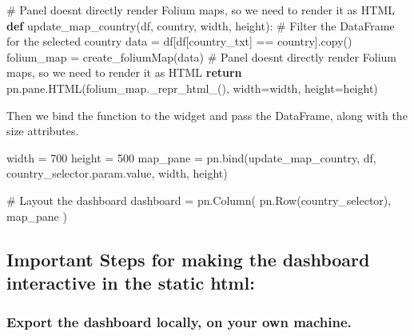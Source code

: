 \documentclass[
  letterpaper,
  DIV=11,
  numbers=noendperiod]{scrreprt}
\newenvironment{Shaded}{\begin{snugshade}}{\end{snugshade}}
\newcommand{\CommentTok}[1]{\textcolor[rgb]{0.37,0.37,0.37}{#1}}
\newcommand{\ControlFlowTok}[1]{\textcolor[rgb]{0.00,0.23,0.31}{\textbf{#1}}}
\newcommand{\DecValTok}[1]{\textcolor[rgb]{0.68,0.00,0.00}{#1}}
\newcommand{\KeywordTok}[1]{\textcolor[rgb]{0.00,0.23,0.31}{\textbf{#1}}}
\newcommand{\NormalTok}[1]{\textcolor[rgb]{0.00,0.23,0.31}{#1}}
\newcommand{\OperatorTok}[1]{\textcolor[rgb]{0.37,0.37,0.37}{#1}}
\newcommand{\StringTok}[1]{\textcolor[rgb]{0.13,0.47,0.30}{#1}}
\begin{document}
\begin{Shaded}
\begin{Highlighting}[]
\CommentTok{\# Panel doesn\textquotesingle{}t directly render Folium maps, so we need to render it as HTML}
\KeywordTok{def}\NormalTok{ update\_map\_country(df, country, width, height):}
    \CommentTok{\# Filter the DataFrame for the selected country}
\NormalTok{    data }\OperatorTok{=}\NormalTok{ df[df[}\StringTok{\textquotesingle{}country\_txt\textquotesingle{}}\NormalTok{] }\OperatorTok{==}\NormalTok{ country].copy()}
\NormalTok{    folium\_map }\OperatorTok{=}\NormalTok{ create\_foliumMap(data)}
    \CommentTok{\# Panel doesn\textquotesingle{}t directly render Folium maps, so we need to render it as HTML}
    \ControlFlowTok{return}\NormalTok{ pn.pane.HTML(folium\_map.\_repr\_html\_(), width}\OperatorTok{=}\NormalTok{width, height}\OperatorTok{=}\NormalTok{height)}
\end{Highlighting}
\end{Shaded}

Then we bind the function to the widget and pass the DataFrame, along
with the size attributes.

\begin{Shaded}
\begin{Highlighting}[]
\NormalTok{width }\OperatorTok{=} \DecValTok{700}
\NormalTok{height }\OperatorTok{=} \DecValTok{500}
\NormalTok{map\_pane }\OperatorTok{=}\NormalTok{ pn.bind(update\_map\_country, df,  country\_selector.param.value, width, height)}

\CommentTok{\# Layout the dashboard}
\NormalTok{dashboard }\OperatorTok{=}\NormalTok{ pn.Column(}
\NormalTok{    pn.Row(country\_selector),}
\NormalTok{    map\_pane}
\NormalTok{)}
\end{Highlighting}
\end{Shaded}

\subsection{\texorpdfstring{Important Steps for making the dashboard
\textbf{interactive} in the static
html:}{Important Steps for making the dashboard interactive in the static html:}}\label{important-steps-for-making-the-dashboard-interactive-in-the-static-html}

\subsubsection{Export the dashboard locally, on your own
machine.}\label{export-the-dashboard-locally-on-your-own-machine.}
\end{document}
